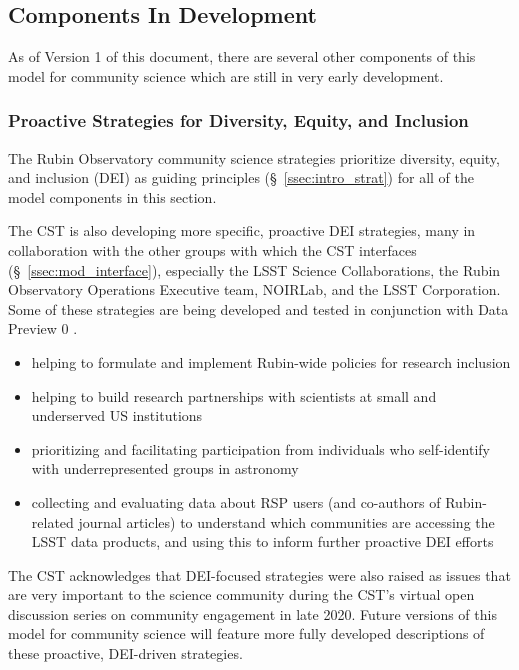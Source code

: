 \documentclass[DM,authoryear,toc]{lsstdoc}
\begin{document}
\subsection{Components In Development}\label{ssec:mod_dev}

As of Version 1 of this document, there are several other components of this model for community science which are still in very early development.


\subsubsection{Proactive Strategies for Diversity, Equity, and Inclusion}\label{sssec:mod_dev_proact}

The Rubin Observatory community science strategies prioritize diversity, equity, and inclusion (DEI) as guiding principles (\S~\ref{ssec:intro_strat}) for all of the model components in this section.

The CST is also developing more specific, proactive DEI strategies, many in collaboration with the other groups with which the CST interfaces (\S~\ref{ssec:mod_interface}), especially the LSST Science Collaborations, the Rubin Observatory Operations Executive team, NOIRLab, and the LSST Corporation.
Some of these strategies are being developed and tested in conjunction with Data Preview 0 .

\begin{itemize}
\item helping to formulate and implement Rubin-wide policies for research inclusion
\item helping to build research partnerships with scientists at small and underserved US institutions
\item prioritizing and facilitating participation from individuals who self-identify with underrepresented groups in astronomy
\item collecting and evaluating data about RSP users (and co-authors of Rubin-related journal articles) to understand which communities are accessing the LSST data products, and using this to inform further proactive DEI efforts
\end{itemize}

The CST acknowledges that DEI-focused strategies were also raised as issues that are very important to the science community during the CST's virtual open discussion series on community engagement in late 2020.
Future versions of this model for community science will feature more fully developed descriptions of these proactive, DEI-driven strategies.
\end{document}
